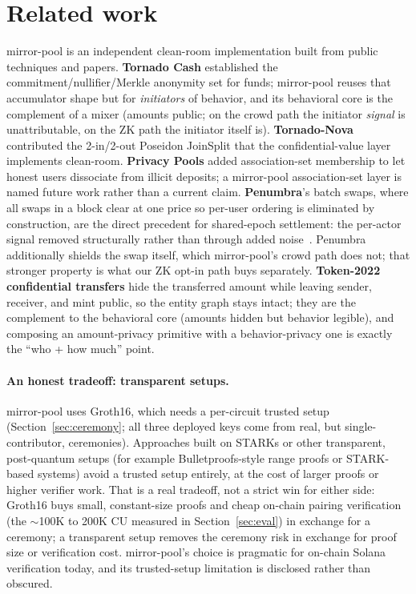 \documentclass[10pt]{article}
\begin{document}
\section{Related work}
\label{sec:related}

mirror-pool is an independent clean-room implementation built from public
techniques and papers. \textbf{Tornado Cash} established the
commitment/nullifier/Merkle anonymity set for funds; mirror-pool reuses that
accumulator shape but for \emph{initiators} of behavior, and its behavioral core
is the complement of a mixer (amounts public; on the crowd path the initiator
\emph{signal} is unattributable, on the ZK path the initiator itself is).
\textbf{Tornado-Nova} contributed the 2-in/2-out Poseidon JoinSplit that the
confidential-value layer implements clean-room. \textbf{Privacy Pools} added
association-set membership to let honest users dissociate from illicit deposits; a
mirror-pool association-set layer is named future work rather than a current
claim. \textbf{Penumbra}'s batch swaps, where all swaps in a block clear at one
price so per-user ordering is eliminated by construction, are the direct precedent
for shared-epoch settlement: the per-actor signal removed structurally rather than
through added noise~\cite{penumbra}. Penumbra additionally shields the swap itself,
which mirror-pool's crowd path does not; that stronger property is what our ZK
opt-in path buys separately.
\textbf{Token-2022 confidential transfers} hide the transferred amount while
leaving sender, receiver, and mint public, so the entity graph stays intact; they
are the complement to the behavioral core (amounts hidden but behavior legible),
and composing an amount-privacy primitive with a behavior-privacy one is exactly
the ``who + how much'' point.

\paragraph{An honest tradeoff: transparent setups.} mirror-pool uses Groth16,
which needs a per-circuit trusted setup (Section~\ref{sec:ceremony}; all three
deployed keys come from real, but single-contributor, ceremonies). Approaches built on
STARKs or other transparent, post-quantum setups (for example Bulletproofs-style
range proofs or STARK-based systems) avoid a trusted setup entirely, at the cost
of larger proofs or higher verifier work. That is a real tradeoff, not a strict
win for either side: Groth16 buys small, constant-size proofs and cheap on-chain
pairing verification (the $\sim$100K to 200K CU measured in
Section~\ref{sec:eval}) in exchange for a ceremony; a transparent setup removes
the ceremony risk in exchange for proof size or verification cost. mirror-pool's
choice is pragmatic for on-chain Solana verification today, and its trusted-setup
limitation is disclosed rather than obscured.
\end{document}
